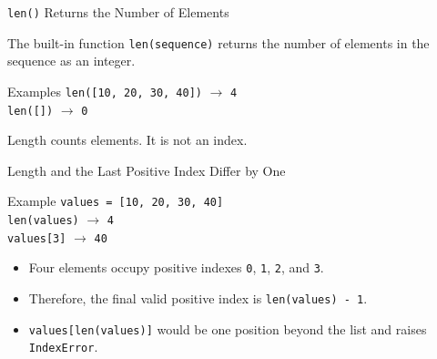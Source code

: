 \documentclass[aspectratio=169,10pt]{beamer}
\begin{document}

\begin{frame}{\texttt{len()} Returns the Number of Elements}
  \begin{cpdefinition}
    The built-in function \texttt{len(sequence)} returns the number of elements in the sequence as an integer.
  \end{cpdefinition}

  \begin{block}{Examples}
    \texttt{len([10, 20, 30, 40])} $\longrightarrow$ \texttt{4}\\
    \texttt{len([])} $\longrightarrow$ \texttt{0}
  \end{block}

  \begin{keyidea}
    Length counts elements. It is not an index.
  \end{keyidea}
\end{frame}

\begin{frame}{Length and the Last Positive Index Differ by One}
  \begin{block}{Example}
    \texttt{values = [10, 20, 30, 40]}\\[0.08in]
    \texttt{len(values)} $\longrightarrow$ \texttt{4}\\
    \texttt{values[3]} $\longrightarrow$ \texttt{40}
  \end{block}

  \begin{itemize}
    \item Four elements occupy positive indexes \texttt{0}, \texttt{1}, \texttt{2}, and \texttt{3}.
    \item Therefore, the final valid positive index is \texttt{len(values) - 1}.
    \item \texttt{values[len(values)]} would be one position beyond the list and raises \texttt{IndexError}.
  \end{itemize}
\end{frame}
\end{document}
